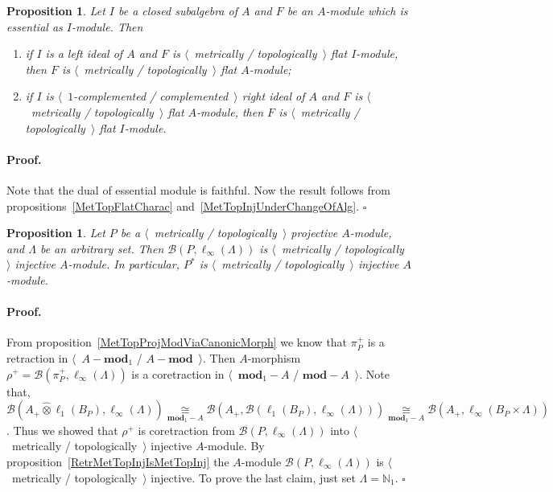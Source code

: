 \documentclass[12pt]{article}
\newcommand{\projtens}{\mathbin{\widehat{\otimes}}}
\newcommand{\isom}[1]{\mathop{\mathbin{\cong}}\limits_{#1}}
\newtheorem{proposition}[theorem]{Proposition}
\renewenvironment{proof}{\paragraph{Proof.}}{\hfill$\square$\medskip}
\begin{document}
\begin{proposition}\label{MetTopFlatUnderChangeOfAlg} Let $I$ be a closed
    subalgebra of $A$ and $F$ be an $A$-module which is essential as $I$-module.
    Then
    \begin{enumerate}[label = (\roman*)]
        \item if $I$ is a left ideal of $A$ and $F$ is $\langle$~metrically /
              topologically~$\rangle$  flat $I$-module, then $F$ is
              $\langle$~metrically / topologically~$\rangle$ flat $A$-module;

        \item if $I$ is $\langle$~$1$-complemented / complemented~$\rangle$
              right ideal of $A$ and $F$ is $\langle$~metrically /
              topologically~$\rangle$ flat $A$-module, then $F$ is
              $\langle$~metrically / topologically~$\rangle$ flat $I$-module.
    \end{enumerate}
\end{proposition}
\begin{proof} Note that the dual of essential module is faithful. Now the result
    follows from propositions~\ref{MetTopFlatCharac}
    and~\ref{MetTopInjUnderChangeOfAlg}.
\end{proof}

\begin{proposition}\label{DualMetTopProjIsMetrInj} Let $P$ be a
    $\langle$~metrically / topologically~$\rangle$ projective $A$-module, and
    $\Lambda$ be an arbitrary set. Then $\mathcal{B}(P,\ell_\infty(\Lambda))$ is
    $\langle$~metrically / topologically~$\rangle$ injective $A$-module. In
    particular, $P^*$ is $\langle$~metrically / topologically~$\rangle$
    injective $A$-module.
\end{proposition}
\begin{proof} From proposition~\ref{MetTopProjModViaCanonicMorph} we know that
    $\pi_P^+$ is a retraction in 
    $\langle$~$A-\mathbf{mod}_1$ / $A-\mathbf{mod}$~$\rangle$. Then
    $A$-morphism $\rho^+=\mathcal{B}(\pi_P^+,\ell_\infty(\Lambda))$ is a
    coretraction in $\langle$~$\mathbf{mod}_1-A$ / $\mathbf{mod}-A$~$\rangle$. 
    Note that,
    $\mathcal{B}(A_+\projtens\ell_1(B_P),\ell_\infty(\Lambda))
        \isom{\mathbf{mod}_1-A}
        \mathcal{B}(A_+,\mathcal{B}(\ell_1(B_P),\ell_\infty(\Lambda)))
        \isom{\mathbf{mod}_1-A}
        \mathcal{B}(A_+,\ell_\infty(B_P\times\Lambda))$. 
    Thus we showed that
    $\rho^+$ is coretraction from $\mathcal{B}(P,\ell_\infty(\Lambda))$ into
    $\langle$~metrically / topologically~$\rangle$ injective $A$-module. By
    proposition~\ref{RetrMetTopInjIsMetTopInj} the $A$-module
    $\mathcal{B}(P,\ell_\infty(\Lambda))$ is $\langle$~metrically /
    topologically~$\rangle$ injective. To prove the last claim, just set
    $\Lambda=\mathbb{N}_1$.
\end{proof}
\end{document}
